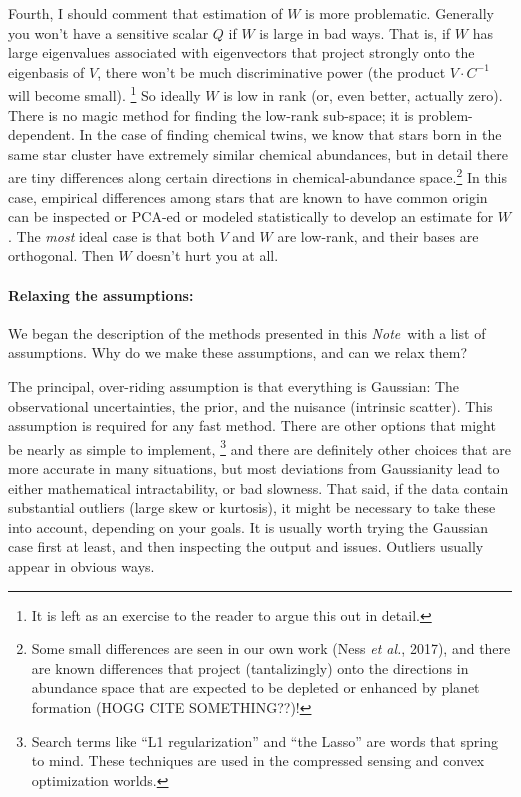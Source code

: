 \documentclass[12pt,letterpaper]{article}
\newcommand{\foreign}[1]{\textsl{#1}}
\newcommand{\acronym}[1]{{\small{#1}}}
\newcommand{\documentname}{\textsl{Note}}
\newcommand{\etal}{\foreign{et al.}}
\newcommand{\inv}[1]{{#1}^{-1}}
\begin{document}
Fourth, I should comment that estimation of $W$ is more
problematic. Generally you won't have a sensitive scalar $Q$ if $W$ is
large in bad ways. That is, if $W$ has large eigenvalues associated
with eigenvectors that project strongly onto the eigenbasis of $V$,
there won't be much discriminative power (the product $V\cdot\inv{C}$
will become small).%
\footnote{It is left as an exercise to the reader to argue this out in detail.}
So ideally $W$ is low in rank (or, even better,
actually zero). There is no magic
method for finding the low-rank sub-space; it is problem-dependent. In
the case of finding chemical twins, we know that stars born in the
same star cluster have extremely similar chemical abundances, but in
detail there are tiny differences along certain directions in
chemical-abundance space.\footnote{%
  Some small differences are seen in our own work (Ness \etal, 2017), and
  there are known differences that project (tantalizingly) onto the directions
  in abundance space that are expected to be depleted or enhanced by planet
  formation (HOGG CITE SOMETHING??)!}
In this case, empirical
differences among stars that are known to have common origin can be
inspected or \acronym{PCA}-ed or modeled statistically to develop an
estimate for $W$. The \emph{most} ideal case is that both $V$ and $W$
are low-rank, and their bases are orthogonal. Then $W$ doesn't hurt
you at all.

\paragraph{Relaxing the assumptions:}
We began the description of the methods presented in this
\documentname\ with a list of assumptions. Why do we make these
assumptions, and can we relax them?

The principal, over-riding assumption is that everything is Gaussian:
The observational uncertainties, the prior, and the nuisance
(intrinsic scatter). This assumption is required for any fast
method. There are other options that might be nearly as simple to implement,%
\footnote{Search terms like ``L1 regularization'' and ``the Lasso''
  are words that spring to mind. These techniques are used in the
  compressed sensing and convex optimization worlds.}
and there are
definitely other choices that are more accurate in many situations,
but most deviations from Gaussianity lead to either mathematical
intractability, or bad slowness. That said, if the data contain
substantial outliers (large skew or kurtosis), it might be necessary
to take these into account, depending on your goals. It is usually worth
trying the Gaussian case first at least, and then inspecting the
output and issues. Outliers usually appear in obvious ways.
\end{document}
